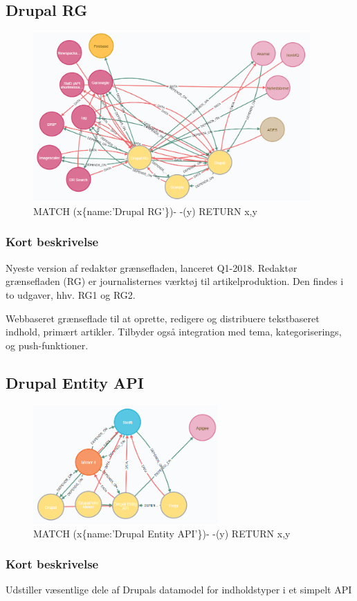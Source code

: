 \documentclass{article}
\begin{document}
\subsection{Drupal RG}
\begin{figure}[h]
\includegraphics[width=300pt]{DrupalRG.PNG}
\caption{MATCH (x\{name:'Drupal RG'\})- -(y) RETURN x,y}
\end{figure}
\subsubsection*{Kort beskrivelse}
Nyeste version af redaktør grænsefladen, lanceret Q1-2018. Redaktør grænsefladen (RG) er journalisternes værktøj til artikelproduktion. Den findes i to udgaver, hhv. RG1 og RG2.	

Webbaseret grænseflade til at oprette, redigere og distribuere tekstbaseret indhold, primært artikler. Tilbyder også integration med tema, kategoriserings, og push-funktioner.



\subsection{Drupal Entity API}
\begin{figure}[h]
\includegraphics[width=200pt]{DrupalEntityAPI.PNG}
\caption{MATCH (x\{name:'Drupal Entity API'\})- -(y) RETURN x,y}
\end{figure}
\subsubsection*{Kort beskrivelse}
Udstiller væsentlige dele af Drupals datamodel for indholdstyper i et simpelt API
\end{document}
